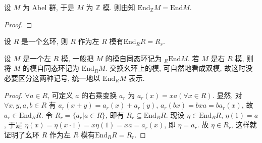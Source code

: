 \documentclass[../../main.tex]{subfiles}%
\begin{document}
\begin{example}
设 \( M \) 为 Abel 群, 于是 \( M \) 为 \( \mathbb{Z} \) 模. 则由知 \( \text{End}_\mathbb{Z} M = \text{End}M \).
\end{example}
\begin{proof}

\end{proof}

\begin{example}
设 \( R \) 是一个幺环, 则 \( R \) 作为左 \( R \) 模有\( \text{End}_R R = R_r \).
\end{example}
\begin{remark}
设 \( M \) 是一个左 \( R \) 模, 一般把 \( M \) 的模自同态环记为 \( _R\text{End}M \). 若 \( M \) 是右 \( R \) 模, 则将 \( M \) 的模自同态环记为 \( \text{End}_R M \). 交换幺环上的模, 可自然地看成双模, 故这时没必要区分这两种记号, 统一地以 \( \text{End}_R M \) 表示.
\end{remark}
\begin{proof}
\( \forall a \in R \), 可定义 \( a \) 的右乘变换 \( a_r \) 为 \( a_r(x) = xa (\forall x \in R) \). 显然, 对 \( \forall x, y, a, b \in R \) 有 \( a_r(x + y) = a_r(x) + a_r(y) \), \( a_r(bx) = bxa = ba_r(x) \), 故 \( a_r \in \text{End}_R R \). 令 \( R_r = \{a_r|a \in R\} \), 即有 \( R_r \subseteq \text{End}_R R \). 现设 \( \eta \in \text{End}_R R \), \( \eta(1) = a \), 于是 \( \eta(x) = \eta(x \cdot 1) = x\eta(1) = xa = a_r(x) \), 即 \( \eta = a_r \). 故 \( \eta \in R_r \), 这样就证明了幺环 \( R \) 作为左 \( R \) 模有\( \text{End}_R R = R_r \).
\end{proof}
\end{document}
